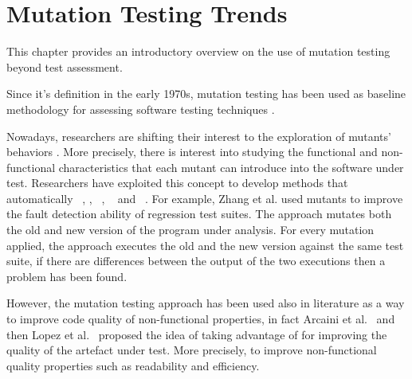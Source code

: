 
\chapter{Mutation Testing Trends}
\label{chapter:trends}



This chapter provides an introductory overview on the use of mutation testing beyond test assessment.

Since it's definition in the early 1970s, mutation testing has been used 
as baseline methodology for assessing software testing techniques \cite{chekam2017empirical}.


Nowadays, researchers are shifting their interest to the exploration of mutants' behaviors \cite{papadakis2019mutation}. 
More precisely, there is interest into studying the functional and non-functional characteristics that each mutant can introduce into the software under test.
Researchers have exploited this concept to develop methods that automatically ~\cite{zhang2016isomorphic},  \cite{papadakis2015metallaxis}, ~\cite{le2011genprog}, ~\cite{loise2017towards} and ~\cite{langdon2017genetic}.
For example, Zhang et al. \cite{zhang2016isomorphic} used mutants to improve the fault detection ability of regression test suites. The approach mutates both the old and new version of the program under analysis. For every mutation applied, the approach executes the old and the new version against the same test suite, if there are differences between the output of the two executions then a problem has been found.


However,
the mutation testing approach has been used also in literature as a way to improve code quality of non-functional properties,
in fact Arcaini et al.~\cite{arcaini2017novel,arcaini2015rehabilitating} and then Lopez et al.~\cite{lopez2018source} proposed the idea of taking advantage of  for improving the quality of the artefact under test.
More precisely, to improve non-functional quality properties such as readability and efficiency.

